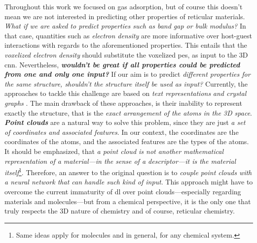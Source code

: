 Throughout this work we focused on gas adsorption, but of course this doesn't
mean we are not interested in predicting other properties of reticular
materials. \emph{What if we are asked to predict
properties such as band gap or bulk modulus?} In that case, quantities such as
\emph{electron density} are more informative over
host-guest interactions with regards to the
aforementioned properties. This entails that the \emph{voxelized electron
density} should substitute the voxelized
\gls{pes}, as input to the 3D \gls{cnn}. Nevertheless, \emph{\textbf{wouldn't be
great if all properties could be predicted from one and only one input?}} If our
aim is to predict \emph{different properties for the same structure, shouldn't
the structure itself be used as input?} Currently, the approaches to tackle this
challenge are based on \emph{text representations}
\parencite{Cao2023, Bucior2019} \emph{and crystal graphs}
\parencite{Chen2019, Xie2018}. The main drawback of these approaches, is their
inability to represent exactly the structure, that is the \emph{exact
arrangement of the atoms in the 3D space}. \emph{\textbf{Point clouds}}
\parencite{Qi2016, Bello2020} are a natural way to solve this problem, since
they are just \emph{a set of coordinates and associated
features}. In our context, the coordinates are the coordinates of the atoms, and
the associated features are the types of the atoms. It should be emphasized,
that \emph{a point cloud is not another mathematical
representation of a material---in the sense of a
descriptor---it is the material itself}\footnote{Same ideas
apply for molecules and in general, for any chemical system.}. Therefore, an answer to the original question is to \emph{couple
point clouds with a neural network that can handle such kind of input}. This
approach might have to overcome the current immaturity of \gls{dl} over point
clouds---especially regarding materials and molecules---but from a chemical
perspective, it is the only one that truly respects the 3D nature of
chemistry and of course, reticular chemistry.
